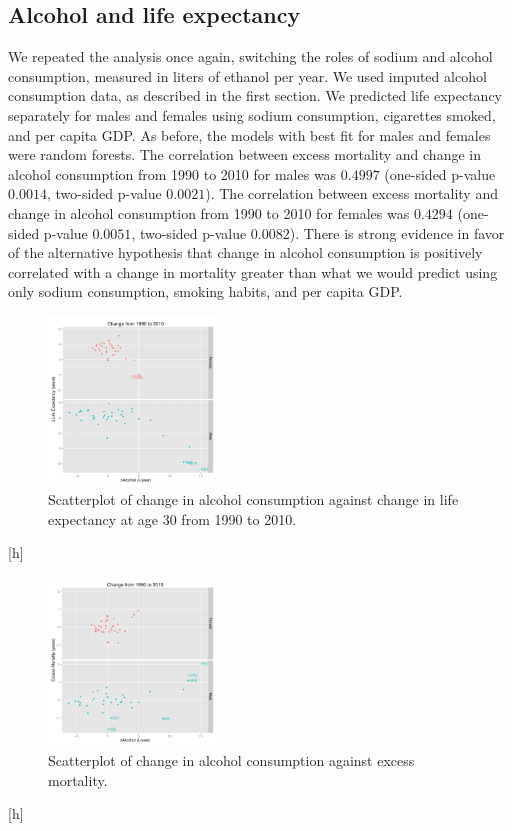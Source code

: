 \documentclass{article}
\begin{document}
\subsection{Alcohol and life expectancy}
We repeated the analysis once again, switching the roles of sodium and alcohol consumption, measured in liters of ethanol per year.  We used imputed alcohol consumption data, as described in the first section. We predicted life expectancy separately for males and females using sodium consumption, cigarettes smoked, and per capita GDP.  As before, the models with best fit for males and females were random forests.  The correlation between excess mortality and change in alcohol consumption from 1990 to 2010 for males was $0.4997$ (one-sided p-value $0.0014$, two-sided p-value $0.0021$).  The correlation between excess mortality and change in alcohol consumption from 1990 to 2010 for females was $0.4294$ (one-sided p-value $0.0051$, two-sided p-value $0.0082$).  There is strong evidence in favor of the alternative hypothesis that change in alcohol consumption is positively correlated with a change in mortality greater than what we would predict using only sodium consumption, smoking habits, and per capita GDP.


\begin{figure}[h]
\centering
\includegraphics[width = 0.4\textwidth]{plots/etoh_lifeexp.pdf}
\caption{Scatterplot of change in alcohol consumption against change in life expectancy at age 30 from 1990 to 2010.}\label{fig:etoh_lifeexp}
\end{figure}[h]

\begin{figure}[h]
\centering
\includegraphics[width = 0.4\textwidth]{plots/etoh_exmort.pdf}
\caption{Scatterplot of change in alcohol consumption against excess mortality.}\label{fig:etoh_excessmortality}
\end{figure}[h]
\end{document}
